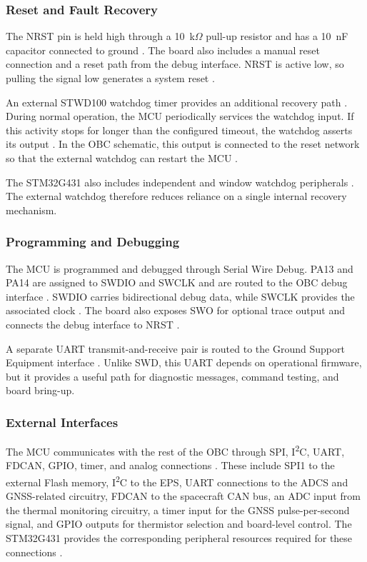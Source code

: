 \documentclass[10pt]{../datasheet}
\begin{document}
\subsubsection{Reset and Fault Recovery}

The NRST pin is held high through a 10~k\(\Omega\) pull-up resistor and has a
10~nF capacitor connected to ground \cite{obc-schematic}. The board also
includes a manual reset connection and a reset path from the debug interface.
NRST is active low, so pulling the signal low generates a system reset
\cite{stm32g431-datasheet,stm32g4-hardware}.

An external STWD100 watchdog timer provides an additional recovery path
\cite{obc-schematic}. During normal operation, the MCU periodically services
the watchdog input. If this activity stops for longer than the configured
timeout, the watchdog asserts its output \cite{stwd100-datasheet}. In the OBC
schematic, this output is connected to the reset network so that the external
watchdog can restart the MCU \cite{obc-schematic,stwd100-datasheet}.

The STM32G431 also includes independent and window watchdog peripherals
\cite{stm32g431-datasheet}. The external watchdog therefore reduces reliance
on a single internal recovery mechanism.

\subsubsection{Programming and Debugging}

The MCU is programmed and debugged through Serial Wire Debug. PA13 and PA14 are
assigned to SWDIO and SWCLK and are routed to the OBC debug interface
\cite{stm32g431-datasheet,obc-schematic}. SWDIO carries bidirectional debug
data, while SWCLK provides the associated clock \cite{arm-swd}. The board also
exposes SWO for optional trace output and connects the debug interface to NRST
\cite{stm32g431-datasheet,obc-schematic}.

A separate UART transmit-and-receive pair is routed to the Ground Support
Equipment interface \cite{obc-schematic}. Unlike SWD, this UART depends on
operational firmware, but it provides a useful path for diagnostic messages,
command testing, and board bring-up.

\subsubsection{External Interfaces}

The MCU communicates with the rest of the OBC through SPI,
I\textsuperscript{2}C, UART, FDCAN, GPIO, timer, and analog connections
\cite{obc-schematic}. These include SPI1 to the external Flash memory,
I\textsuperscript{2}C to the EPS, UART connections to the ADCS and GNSS-related
circuitry, FDCAN to the spacecraft CAN bus, an ADC input from the thermal
monitoring circuitry, a timer input for the GNSS pulse-per-second signal, and
GPIO outputs for thermistor selection and board-level control. The STM32G431
provides the corresponding peripheral resources required for these connections
\cite{stm32g431-datasheet}.
\end{document}
